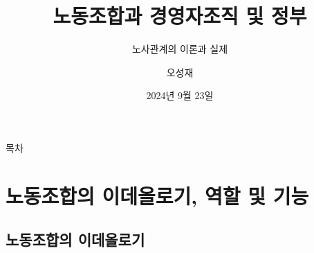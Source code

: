 \documentclass[aspectratio=169,xcolor=dvipsnames,handout]{beamer}
\title{노동조합과 경영자조직 및 정부}
\subtitle{노사관계의 이론과 실제}
\author{오성재}
\institute[CNU]
{\relax
    충남대학교 경제학과\\
}
\date{2024년 9월 23일}
\begin{document}

\frame{\titlepage}

\begin{frame}{목차}
    \small
    \tableofcontents[hideallsubsections]
\end{frame}

\section{노동조합의 이데올로기, 역할 및 기능}

\subsection{노동조합의 이데올로기}
\end{document}
